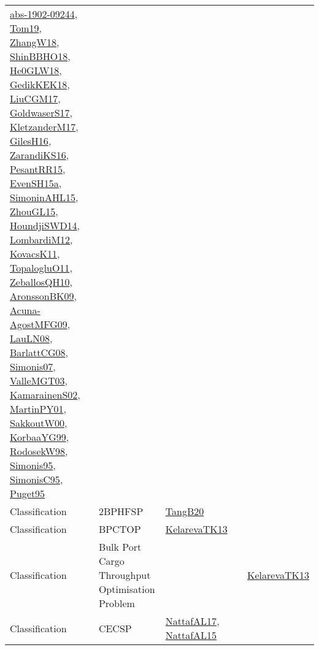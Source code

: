 {\begin{longtable}{lp{3cm}>{\raggedright}p{6cm}>{\raggedright}p{6cm}p{8cm}}
\href{articles/abs-1902-09244.pdf}{abs-1902-09244}\cite{abs-1902-09244}, \href{papers/Tom19.pdf}{Tom19}\cite{Tom19}, \href{articles/ZhangW18.pdf}{ZhangW18}\cite{ZhangW18}, \href{articles/ShinBBHO18.pdf}{ShinBBHO18}\cite{ShinBBHO18}, \href{papers/He0GLW18.pdf}{He0GLW18}\cite{He0GLW18}, \href{articles/GedikKEK18.pdf}{GedikKEK18}\cite{GedikKEK18}, \href{papers/LiuCGM17.pdf}{LiuCGM17}\cite{LiuCGM17}, \href{papers/GoldwaserS17.pdf}{GoldwaserS17}\cite{GoldwaserS17}, \href{papers/KletzanderM17.pdf}{KletzanderM17}\cite{KletzanderM17}, \href{papers/GilesH16.pdf}{GilesH16}\cite{GilesH16}, \href{articles/ZarandiKS16.pdf}{ZarandiKS16}\cite{ZarandiKS16}, \href{papers/PesantRR15.pdf}{PesantRR15}\cite{PesantRR15}, \href{articles/EvenSH15a.pdf}{EvenSH15a}\cite{EvenSH15a}, \href{articles/SimoninAHL15.pdf}{SimoninAHL15}\cite{SimoninAHL15}, \href{papers/ZhouGL15.pdf}{ZhouGL15}\cite{ZhouGL15}, \href{papers/HoundjiSWD14.pdf}{HoundjiSWD14}\cite{HoundjiSWD14}, \href{articles/LombardiM12.pdf}{LombardiM12}\cite{LombardiM12}, \href{articles/KovacsK11.pdf}{KovacsK11}\cite{KovacsK11}, \href{articles/TopalogluO11.pdf}{TopalogluO11}\cite{TopalogluO11}, \href{articles/ZeballosQH10.pdf}{ZeballosQH10}\cite{ZeballosQH10}, \href{papers/AronssonBK09.pdf}{AronssonBK09}\cite{AronssonBK09}, \href{papers/Acuna-AgostMFG09.pdf}{Acuna-AgostMFG09}\cite{Acuna-AgostMFG09}, \href{papers/LauLN08.pdf}{LauLN08}\cite{LauLN08}, \href{papers/BarlattCG08.pdf}{BarlattCG08}\cite{BarlattCG08}, \href{articles/Simonis07.pdf}{Simonis07}\cite{Simonis07}, \href{papers/ValleMGT03.pdf}{ValleMGT03}\cite{ValleMGT03}, \href{papers/KamarainenS02.pdf}{KamarainenS02}\cite{KamarainenS02}, \href{articles/MartinPY01.pdf}{MartinPY01}\cite{MartinPY01}, \href{articles/SakkoutW00.pdf}{SakkoutW00}\cite{SakkoutW00}, \href{papers/KorbaaYG99.pdf}{KorbaaYG99}\cite{KorbaaYG99}, \href{papers/RodosekW98.pdf}{RodosekW98}\cite{RodosekW98}, \href{papers/Simonis95.pdf}{Simonis95}\cite{Simonis95}, \href{papers/SimonisC95.pdf}{SimonisC95}\cite{SimonisC95}, \href{papers/Puget95.pdf}{Puget95}\cite{Puget95}\\
Classification & 2BPHFSP & \href{papers/TangB20.pdf}{TangB20}\cite{TangB20} &  & \\
Classification & BPCTOP & \href{papers/KelarevaTK13.pdf}{KelarevaTK13}\cite{KelarevaTK13} &  & \\
Classification & Bulk Port Cargo Throughput Optimisation Problem &  &  & \href{papers/KelarevaTK13.pdf}{KelarevaTK13}\cite{KelarevaTK13}\\
Classification & CECSP & \href{articles/NattafAL17.pdf}{NattafAL17}\cite{NattafAL17}, \href{articles/NattafAL15.pdf}{NattafAL15}\cite{NattafAL15} &  & \\

\end{longtable}}
